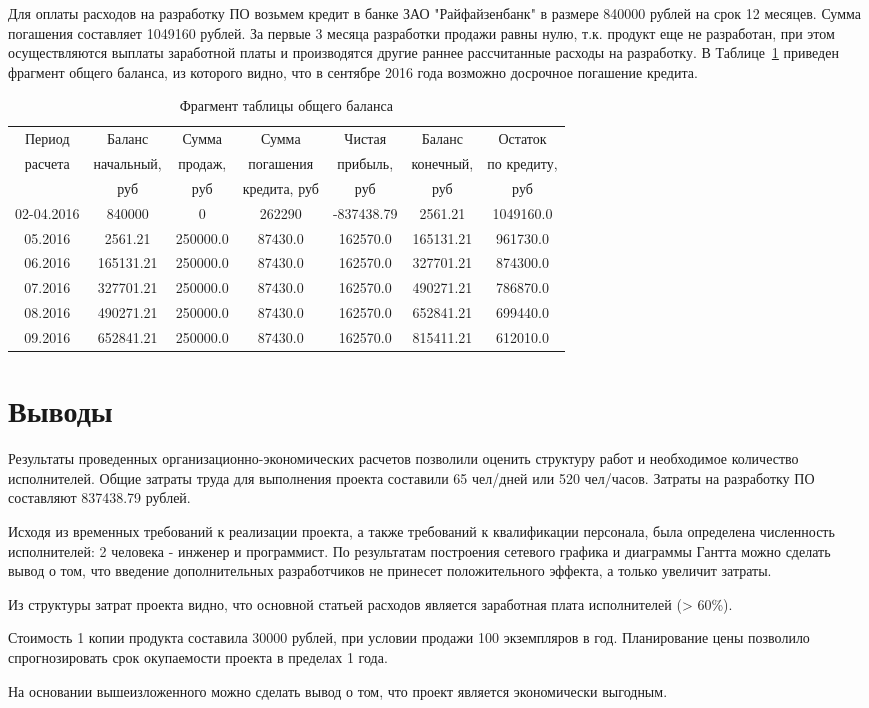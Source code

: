 Для оплаты расходов на разработку ПО возьмем кредит в банке ЗАО "Райфайзенбанк" в размере 840000 рублей на срок 12 месяцев. Сумма погашения составляет 1049160 рублей. За первые 3 месяца разработки продажи равны нулю, т.к. продукт еще не разработан, при этом осуществляются выплаты заработной платы и производятся другие раннее рассчитанные расходы на разработку. В Таблице~\ref{table:money_balance} приведен фрагмент общего баланса, из которого видно, что в сентябре 2016 года возможно досрочное погашение кредита.
\begin{table}
\caption{Фрагмент таблицы общего баланса}
\label{table:money_balance}
\begin{tabular} {| c | c | c | c | c | c | c |} 
\hline
Период & Баланс & Сумма & Сумма & Чистая & Баланс & Остаток\\
расчета & начальный, & продаж, & погашения & прибыль, & конечный, & по кредиту,\\
& руб & руб & кредита, руб & руб & руб & руб\\
\hline
02-04.2016 & 840000 & 0 & 262290 & -837438.79 & 2561.21 & 1049160.0\\
\hline
05.2016 & 2561.21 & 250000.0 & 87430.0 & 162570.0 & 165131.21 & 961730.0\\
\hline
06.2016 & 165131.21 & 250000.0 & 87430.0 & 162570.0 & 327701.21 & 874300.0\\
\hline
07.2016 & 327701.21 & 250000.0 & 87430.0 & 162570.0 & 490271.21 & 786870.0\\
\hline
08.2016 & 490271.21 & 250000.0 & 87430.0 & 162570.0 & 652841.21 & 699440.0\\
\hline
09.2016 & 652841.21 & 250000.0 & 87430.0 & 162570.0 & 815411.21 & 612010.0\\
\hline
\end{tabular}
\end{table}


\section{Выводы}
Результаты проведенных организационно-экономических расчетов позволили оценить структуру работ и необходимое количество исполнителей. Общие затраты труда для выполнения проекта составили 65 чел/дней или 520 чел/часов. Затраты на разработку ПО составляют 837438.79 рублей.

Исходя из временных требований к реализации проекта, а также требований к квалификации персонала, была определена численность исполнителей: 2 человека - инженер и программист. По результатам построения сетевого графика и диаграммы Гантта можно сделать вывод о том, что введение дополнительных разработчиков не принесет положительного эффекта, а только увеличит затраты.

Из структуры затрат проекта видно, что основной статьей расходов является заработная плата исполнителей (> 60\%).

Стоимость 1 копии продукта составила 30000 рублей, при условии продажи 100 экземпляров в год. Планирование цены позволило спрогнозировать срок окупаемости проекта в пределах 1 года.

На основании вышеизложенного можно сделать вывод о том, что проект является экономически выгодным.
